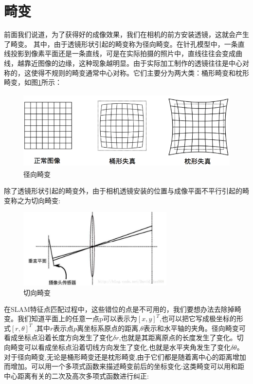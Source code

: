 \section{畸变}
前面我们说道，为了获得好的成像效果，我们在相机的前方安装透镜，这就会产生了畸变。
其中，由于透镜形状引起的畸变称为径向畸变。在针孔模型中，一条直线投影到像素平面还是一条直线，可是在实际拍摄的照片中，直线往往会变成曲线，越靠近图像的边缘，这种现象越明显。由于实际加工制作的透镜往往是中心对称的，这使得不规则的畸变通常中心对称。它们主要分为两大类：桶形畸变和枕形畸变，如图\ref{jingxiangjibian}所示：
\begin{figure}
	\centering
	\includegraphics[height=4cm]{figures/jibian.png}
	\caption{径向畸变}\label{jingxiangjibian}
\end{figure}\par
除了透镜形状引起的畸变外，由于相机透镜安装的位置与成像平面不平行引起的畸变称之为切向畸变:
\begin{figure}
	\centering
	\includegraphics[height=4cm]{figures/qiexiangjibian.jpg}
	\caption{切向畸变}\label{qiexiangjibian}
\end{figure}\par
在SLAM特征点匹配过程中，这些错位的点是不可用的，我们要想办法去除掉畸变。我们知道平面上的任意一点p可以表示为$[x,y]^T$,也可以把它写成极坐标的形式$[r,\theta]^T$ ,其中$r$表示点$p$离坐标系原点的距离,$\theta$表示和水平轴的夹角。径向畸变可看成坐标点沿着长度方向发生了变化$\delta r$,也就是其距离原点的长度发生了变化。切向畸变可以看成坐标点沿着切线方向发生了变化,也就是水平夹角发生了变化$\delta \theta$。对于径向畸变,无论是桶形畸变还是枕形畸变,由于它们都是随着离中心的距离增加而增加。可以用一个多项式函数来描述畸变前后的坐标变化:这类畸变可以用和距中心距离有关的二次及高次多项式函数进行纠正:

